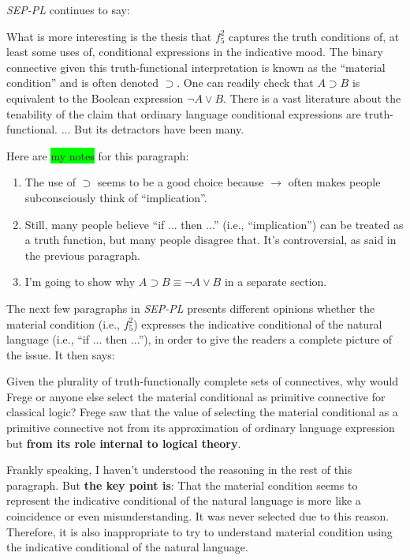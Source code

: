 \documentclass[12pt, letterpaper]{article}
\begin{document}
\textit{SEP-PL} continues to say:

\begin{displayquote}
  What is more interesting is the thesis that $f_5^2$ captures the truth
  conditions of, at least some uses of, conditional expressions in the
  indicative mood. The binary connective given this truth-functional
  interpretation is known as the ``material condition'' and is often denoted
  $\supset$. One can readily check that $A \supset B$ is equivalent to the
  Boolean expression $\lnot A \lor B$. There is a vast literature about the
  tenability of the claim that ordinary language conditional expressions are
  truth-functional. ... But its detractors have been many.
\end{displayquote}

Here are \colorbox{lime}{my notes} for this paragraph:
\begin{enumerate}
  \item The use of $\supset$ seems to be a good choice because $\rightarrow$
    often makes people subconsciously think of ``implication''.
  \item Still, many people believe ``if ... then ...'' (i.e., ``implication'')
    can be treated as a truth function, but many people disagree that. It's
    controversial, as said in the previous paragraph.
  \item I'm going to show why $A \supset B \equiv \lnot A \lor B$ in a separate
    section.
\end{enumerate}

The next few paragraphs in \textit{SEP-PL} presents different opinions whether
the material condition (i.e., $f_5^2$) expresses the indicative conditional of
the natural language (i.e., ``if ... then ...''), in order to give the readers
a complete picture of the issue. It then says:

\begin{displayquote}
  Given the plurality of truth-functionally complete sets of connectives, why
  would Frege or anyone else select the material conditional as primitive
  connective for classical logic? Frege saw that the value of selecting the
  material conditional as a primitive connective not from its approximation of
  ordinary language expression but \textbf{from its role internal to logical
  theory}.
\end{displayquote}

Frankly speaking, I haven't understood the reasoning in the rest of this
paragraph. But \textbf{the key point is}: That the material condition seems to
represent the indicative conditional of the natural language is more like a
coincidence or even misunderstanding. It was never selected due to this reason.
Therefore, it is also inappropriate to try to understand material condition
using the indicative conditional of the natural language.
\end{document}

